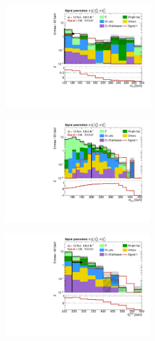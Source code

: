 \begin{figure}
	\centering
	\begin{subfigure}[b]{0.5\linewidth}
		\centering\includegraphics[width=0.7\textwidth]{N-1_cut_scan/n1_300_150/mt}
		\caption{}
	\end{subfigure}\hfill
	\begin{subfigure}[b]{0.5\linewidth}
		\centering\includegraphics[width=0.7\textwidth]{N-1_cut_scan/n1_300_150/mct}
		\caption{}
	\end{subfigure}\hfill
	\begin{subfigure}[b]{0.5\linewidth}
		\centering\includegraphics[width=0.7\textwidth]{N-1_cut_scan/n1_300_150/met}

\end{subfigure}
\end{figure}
